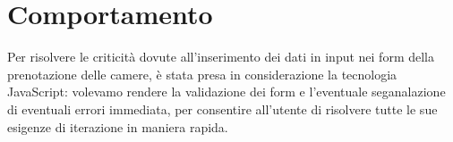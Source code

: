\section{Comportamento} %
Per risolvere le criticità dovute all'inserimento dei dati in input nei form della prenotazione delle camere, è stata presa in considerazione la tecnologia JavaScript: volevamo rendere la validazione dei form e l'eventuale seganalazione di eventuali errori immediata, per consentire all'utente di risolvere tutte le sue esigenze di iterazione in maniera rapida. 
